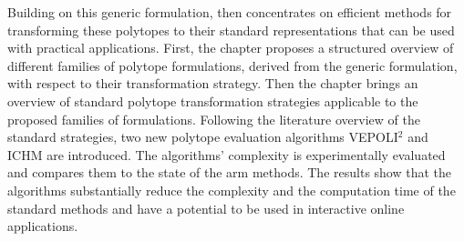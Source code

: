 
Building on this generic formulation,  then concentrates on efficient methods for transforming these polytopes to their standard representations that can be used with practical applications. First, the chapter proposes a structured overview of different families of polytope formulations, derived from the generic formulation, with respect to their transformation strategy. Then the chapter brings an overview of standard polytope transformation strategies applicable to the proposed families of formulations. 
Following the literature overview of the standard strategies, two new polytope evaluation algorithms VEPOLI$^2$ and ICHM are introduced. The algorithms' complexity is experimentally evaluated and compares them to the state of the arm methods. The results show that the algorithms substantially reduce the complexity and the computation time of the standard methods and have a potential to be used in interactive online applications.


